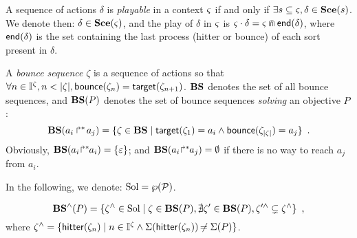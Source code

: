 A sequence of actions $\delta$ is \emph{playable} in a context $\varsigma$ if and only if 
$\exists s \subseteq \varsigma, \delta \in \mathbf{Sce}(s)$.
We denote then: $\delta \in \mathbf{Sce}(\varsigma)$,
and the play of $\delta$ in $\varsigma$ is $\varsigma \cdot \delta = \varsigma \Cap \mathsf{end}(\delta)$,
where $\mathsf{end}(\delta)$ is the set containing the last process (hitter or bounce) of each sort present in $\delta$.

\begin{comment}
  \begin{definition}[Objective sequence ($\OS$)]
  \label{def:OS}
  \towrite{Simplifier / réécrire en dehors d'une def}
    An \emph{objective sequence} is a sequence $\w = P_1 \concat \dots \concat P_{|\w|}$,
    where $\forall n \in \indexes{\w}, \w_n \in \Obj$ and $a_i = \PHtarget(\w_n) \Rightarrow \last_a(\w_{1..n-1}) \in \{ \varnothing, a_i \}$.
    The set of all objective sequences is denoted by $\OS$.
    The definitions of $\last_a$ \todo{À définir}, $\first_a$ \todo{À définir}, $\supp$ \todo{À définir} and $\ceil$ \todo{À définir}
    are simply derived by omitting the case of hitters.
  \end{definition}
\end{comment}

\begin{definition}
\label{def:bs}
  A \emph{bounce sequence} $\zeta$ is a sequence of actions so that $\forall n \in \mathbb{I}^{\zeta}, n < |\zeta|, \mathsf{bounce}(\zeta_{n}) = \mathsf{target}(\zeta_{n+1})$.
  $\mathbf{BS}$ denotes the set of all bounce sequences, and
  $\mathbf{BS}(P)$ denotes the set of bounce sequences \emph{solving} an objective $P$:
  \[
    \mathbf{BS}(\mbox{$a_i\Rsh^*\!a_j$}) = \{ \zeta \in \mathbf{BS} \mid \mathsf{target}(\zeta_1)= a_i \wedge \mathsf{bounce}(\zeta_{|\zeta|}) = a_j \} \enspace.
  \]
  Obviously, $\mathbf{BS}({a_i\!\Rsh^*\!\!a_i}) = \{\varepsilon\}$; and $\mathbf{BS}({a_i\!\Rsh^*\!\!a_j}) = \emptyset$ if there is no way to reach $a_j$ from $a_i$.
\end{definition}

In the following, we denote: $\mathrm{Sol} = \wp(\mathcal{P})$.
\begin{definition}[$\aBS:\Obj \mapsto \powerset(\Sol)$]
\label{def:aBS}
  \[
    \mathbf{BS}^\wedge(P) = \{ \zeta^\wedge \in \mathrm{Sol} \mid \zeta \in \mathbf{BS}(P), \nexists \zeta' \in \mathbf{BS}(P), \zeta'^\wedge \subsetneq \zeta^\wedge \} \enspace,
  \]
  where $\zeta^\wedge = \{ \mathsf{hitter}(\zeta_n) \mid  n \in \mathbb{I}^{\zeta} \wedge \Sigma(\mathsf{hitter}(\zeta_n)) \not\nobreak\mkern -2mu = \Sigma(P) \}$.
\end{definition}



